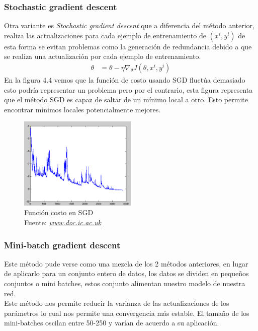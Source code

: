 \subsubsection{Stochastic gradient descent}
Otra variante es \textit{Stochastic gradient descent} que a diferencia del método anterior, realiza las actualizaciones para cada ejemplo de entrenamiento de $(x^{i},y^{i})$ de esta forma se evitan problemas como la generación de redundancia debido a que se realiza una actualización por cada ejemplo de entrenamiento.
\begin{equation}
\label{sgds}
\begin{aligned}
\theta &= \theta - \eta \nabla_{\theta} J(\theta,x^{i},y^{i})
\end{aligned}
\end{equation}
En la figura 4.4 vemos que la función de costo usando SGD fluctúa demasiado esto podría representar un problema pero por el contrario, esta figura representa que el método SGD es capaz de saltar de un mínimo local a otro. Esto permite encontrar mínimos locales potencialmente mejores.

\begin{figure}[H]
	\centering
	\includegraphics[width=0.5\textwidth]{Figures/sgd.png}
	\caption{Función costo en SGD \\ Fuente:  \href{https://www.doc.ic.ac.uk/~js4416/163/website/neural-networks/optimisers.html}{\textit{www.doc.ic.ac.uk}}}
	\label{funcion costo}
\end{figure} 

\subsubsection{Mini-batch gradient descent}
Este método pude verse como una mezcla de los 2 métodos anteriores, en lugar de aplicarlo para un conjunto entero de datos, los datos se dividen en pequeños conjuntos o mini batches, estos conjunto alimentan nuestro modelo de nuestra red.\\			
Este método nos permite reducir la varianza de las actualizaciones de los parámetros lo cual nos permite una convergencia más estable. El tamaño de los mini-batches oscilan entre 50-250 y varían de acuerdo a su aplicación.

